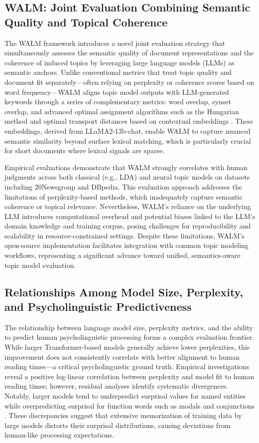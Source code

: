 \subsection{WALM: Joint Evaluation Combining Semantic Quality and Topical Coherence}

The WALM framework introduces a novel joint evaluation strategy that simultaneously assesses the semantic quality of document representations and the coherence of induced topics by leveraging large language models (LLMs) as semantic anchors. Unlike conventional metrics that treat topic quality and document fit separately—often relying on perplexity or coherence scores based on word frequency—WALM aligns topic model outputs with LLM-generated keywords through a series of complementary metrics: word overlap, synset overlap, and advanced optimal assignment algorithms such as the Hungarian method and optimal transport distances based on contextual embeddings \cite{ref47}. These embeddings, derived from LLaMA2-13b-chat, enable WALM to capture nuanced semantic similarity beyond surface lexical matching, which is particularly crucial for short documents where lexical signals are sparse.

Empirical evaluations demonstrate that WALM strongly correlates with human judgments across both classical (e.g., LDA) and neural topic models on datasets including 20Newsgroup and DBpedia. This evaluation approach addresses the limitations of perplexity-based methods, which inadequately capture semantic coherence or topical relevance. Nevertheless, WALM’s reliance on the underlying LLM introduces computational overhead and potential biases linked to the LLM’s domain knowledge and training corpus, posing challenges for reproducibility and scalability in resource-constrained settings. Despite these limitations, WALM’s open-source implementation facilitates integration with common topic modeling workflows, representing a significant advance toward unified, semantics-aware topic model evaluation.

\subsection{Relationships Among Model Size, Perplexity, and Psycholinguistic Predictiveness}

The relationship between language model size, perplexity metrics, and the ability to predict human psycholinguistic processing forms a complex evaluation frontier. While larger Transformer-based models generally achieve lower perplexities, this improvement does not consistently correlate with better alignment to human reading times—a critical psycholinguistic ground truth. Empirical investigations reveal a positive log-linear correlation between perplexity and model fit to human reading times; however, residual analyses identify systematic divergences. Notably, larger models tend to underpredict surprisal values for named entities while overpredicting surprisal for function words such as modals and conjunctions \cite{ref33,ref35}. These discrepancies suggest that extensive memorization of training data by large models distorts their surprisal distributions, causing deviations from human-like processing expectations.

